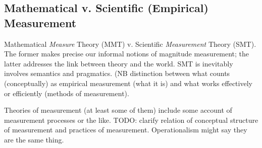 \documentclass[11pt,twoside]{article}
\begin{document}
\subsection{Mathematical v. Scientific (Empirical) Measurement}

Mathematical \textit{Measure} Theory (MMT) v. Scientific
\textit{Measurement} Theory (SMT).  The former makes precise our
informal notions of magnitude measurement; the latter addresses the
link between theory and the world.  SMT is inevitably involves
semantics and pragmatics.  (NB distinction between what counts
(conceptually) as empirical measurement (what it is) and what works
effectively or efficiently (methods of measurement).

Theories of measurement (at least some of them) include some account
of measurement processes or the like.  TODO: clarify relation of
conceptual structure of measurement and practices of measurement.
Operationalism might say they are the same thing.  
\end{document}
